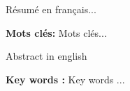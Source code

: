 \bigskip
\begin{multicols}{2}
Résumé en français...
\end{multicols}

\noindent\textbf{Mots clés:}\bigskip
Mots clés...
\newpage
{}\bigskip

\begin{multicols}{2}
Abstract in english
\end{multicols}

\noindent\textbf{Key words :}\bigskip
Key words ...